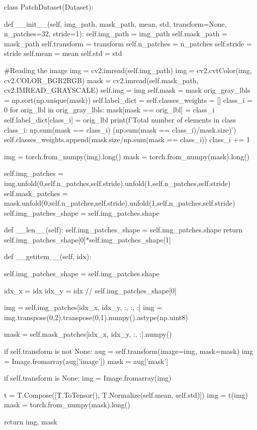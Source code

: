 \documentclass[10pt, a4paper]{article}
\begin{document}
\begin{python}
class PatchDataset(Dataset):
    
    def __init__(self, img_path, mask_path, mean, std, transform=None, n_patches=32, stride=1):
        self.img_path = img_path
        self.mask_path = mask_path
        self.transform = transform
        self.n_patches = n_patches
        self.stride = stride
        self.mean = mean
        self.std = std

        #Reading the image
        img = cv2.imread(self.img_path)
        img = cv2.cvtColor(img, cv2.COLOR_BGR2RGB)
        mask = cv2.imread(self.mask_path, cv2.IMREAD_GRAYSCALE)
        self.img = img
        self.mask = mask
        orig_gray_lbls = np.sort(np.unique(mask))
        self.label_dict = {}
        self.classes_weights = []
        class_i = 0
        for orig_lbl in orig_gray_lbls:
          mask[mask == orig_lbl] = class_i
          self.label_dict[class_i] = orig_lbl
          print(f'Total number of elements in class {class_i}: {np.sum(mask == class_i)} ({np.sum(mask == class_i)/mask.size})')
          self.classes_weights.append(mask.size/np.sum(mask == class_i))
          class_i += 1
        
        img = torch.from_numpy(img).long()
        mask = torch.from_numpy(mask).long()

        self.img_patches = img.unfold(0,self.n_patches,self.stride).unfold(1,self.n_patches,self.stride)
        self.mask_patches = mask.unfold(0,self.n_patches,self.stride).unfold(1,self.n_patches,self.stride)
        self.img_patches_shape = self.img_patches.shape
        
    def __len__(self):
        self.img_patches_shape = self.img_patches.shape
        return self.img_patches_shape[0]*self.img_patches_shape[1]
    
    def __getitem__(self, idx):

        self.img_patches_shape = self.img_patches.shape
        
        idx_x = idx %
        idx_y = idx // self.img_patches_shape[0]

        img = self.img_patches[idx_x, idx_y, :, :, :]
        img = img.transpose(0,2).transpose(0,1).numpy().astype(np.uint8)

        mask = self.mask_patches[idx_x, idx_y, :,  :].numpy()

        if self.transform is not None:
            aug = self.transform(image=img, mask=mask)
            img = Image.fromarray(aug['image'])
            mask = aug['mask']
        
        if self.transform is None:
            img = Image.fromarray(img)
        
        t = T.Compose([T.ToTensor(), T.Normalize(self.mean, self.std)])
        img = t(img)
        mask = torch.from_numpy(mask).long()
            
        return img, mask

\end{python}
\end{document}
